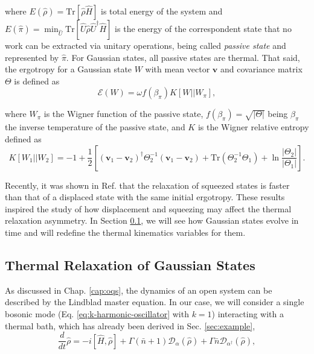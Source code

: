 \noindent where $E(\hat{\rho}) = \text{Tr}[\hat{\rho} \hat{H}]$ is total energy of the system and $E(\hat{\pi}) = \min_{\hat{U}} \text{Tr}[\hat{U} \hat{\rho} \hat{U}^\dagger \hat{H}]$ is the energy of the correspondent state that no work can be extracted via unitary operations, being called \textit{passive state} and represented by $\hat{\pi}$. For Gaussian states, all passive states are thermal. That said, the ergotropy for a Gaussian state $W$ with mean vector $\mathbf{v}$ and covariance matrix $\Theta$ is defined as
\begin{equation}
    \mathcal{E}(W) = \omega f(\beta_\pi) K[W || W_\pi],
\end{equation}

\noindent where $W_\pi$ is the Wigner function of the passive state, $f(\beta_\pi) = \sqrt{|\Theta|}$ being $\beta_\pi$ the inverse temperature of the passive state, and $K$ is the Wigner relative entropy defined as
\begin{equation}
   K[W_1 || W_2] = -1 + \frac{1}{2} \left[(\mathbf{v}_1 - \mathbf{v}_2)^\dagger \Theta_2^{-1} (\mathbf{v}_1 - \mathbf{v}_2) + \text{Tr}(\Theta_2^{-1} \Theta_1) + \ln \frac{|\Theta_2|}{|\Theta_1|} \right].
   \label{eq:wigner-relative-entropy}
\end{equation}

Recently, it was shown in Ref. \cite{medina-2025} that the relaxation of squeezed states is faster than that of a displaced state with the same initial ergotropy. These results inspired the study of how displacement and squeezing may affect the thermal relaxation asymmetry. In Section \ref{sec:result-gaussian}, we will see how Gaussian states evolve in time and will redefine the thermal kinematics variables for them.


\subsection{Thermal Relaxation of Gaussian States}\label{sec:result-gaussian}

As discussed in Chap. \ref{cap:oqs}, the dynamics of an open system can be described by the Lindblad master equation. In our case, we will consider a single bosonic mode (Eq. \eqref{eq:k-harmonic-oscillator} with $k=1$) interacting with a thermal bath, which has already been derived in Sec. \ref{sec:example},
\begin{equation}
    \frac{d}{dt} \hat{\rho} = -i [\hat{H}, \hat{\rho}] + \Gamma (\bar{n}+1) \mathcal{D}_\alpha(\hat{\rho}) + \Gamma \bar{n}\mathcal{D}_{\alpha^\dagger} (\hat{\rho}),
    \label{eq:lindblad-gaussian}
\end{equation}


